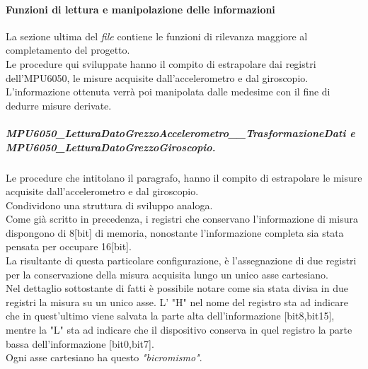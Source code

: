 \documentclass[11pt]{report}
\begin{document}
\paragraph{Funzioni di lettura e manipolazione delle informazioni}
La sezione ultima del \textit{file} contiene le funzioni di rilevanza maggiore al completamento del progetto.\\
Le procedure qui sviluppate hanno il compito di estrapolare dai registri dell'MPU6050, le misure acquisite dall'accelerometro e dal giroscopio. L'informazione ottenuta verrà poi manipolata dalle medesime con il fine di dedurre misure derivate.

\subparagraph{MPU6050\_LetturaDatoGrezzoAccelerometro\_\_TrasformazioneDati e\\ MPU6050\_LetturaDatoGrezzoGiroscopio.}
Le procedure che intitolano il paragrafo, hanno il compito di estrapolare le misure acquisite dall'accelerometro e dal giroscopio.\\Condividono una struttura di sviluppo analoga.\\
Come già scritto in precedenza, i registri che conservano l'informazione di misura dispongono di 8[bit] di memoria, nonostante l'informazione completa sia stata pensata per occupare 16[bit].\\
La risultante di questa particolare configurazione, è l'assegnazione di due registri per la conservazione della misura acquisita lungo un unico asse cartesiano.\\
Nel dettaglio sottostante di fatti è possibile notare come sia stata divisa in due registri la misura su un unico asse.
L' "H" nel nome del registro sta ad indicare che in quest'ultimo viene salvata la parte alta dell'informazione [bit8,bit15], mentre la "L" sta ad indicare che il dispositivo conserva in quel registro la parte bassa dell'informazione [bit0,bit7].\\
Ogni asse cartesiano ha questo \textit{"bicromismo"}.
\begin{table}[H]
    \centering
    \caption{Dettaglio sull'adiacenza dei registri contenenti l'informazione}
    \label{tab: tabella}
\end{table}
\end{document}
